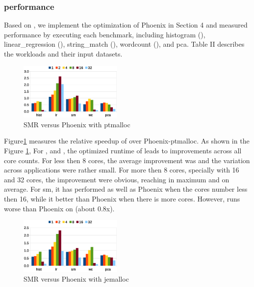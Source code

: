 \subsubsection{performance}
Based on \myth, we implement the optimization of Phoenix in Section 4 and measured \myds performance by executing each benchmark, including histogram (), linear\_regression (), string\_match (), wordcount (), and pca. 
Table II describes the workloads and their input datasets. 
\begin{figure}[!h!t]  
	\centering
	\includegraphics[width=0.45\textwidth]{eps/dmr_time_array.eps}
	\caption{SMR versus Phoenix with ptmalloc}
	\label{fig:smr:time:ptmalloc}
\end{figure}

Figure\ref{fig:smr:time:ptmalloc} measures the relative speedup of \myds over Phoenix-ptmalloc. 
As shown in the Figure \ref{fig:smr:time:ptmalloc}, For ,  and , the optimized runtime of \myds leads to improvements across all core counts.
For less then 8 cores, the average improvement was  and the variation across applications were rather small.
For more then 8 cores, specially with 16 and 32 cores, the improvement were obvious, reaching  in maximum and  on average.
For sm, it has performed as well as Phoenix when the cores number less then 16, while it better than Phoenix when there is more cores.
However, \myds runs worse than Phoenix on  (about 0.8x).
\begin{figure}[!h!t]  
	\centering
	\includegraphics[width=0.45\textwidth]{eps/dmr_time_jemalloc.eps}
	\caption{SMR versus Phoenix with jemalloc}
	\label{fig:smr:time:jemalloc}
\end{figure}

